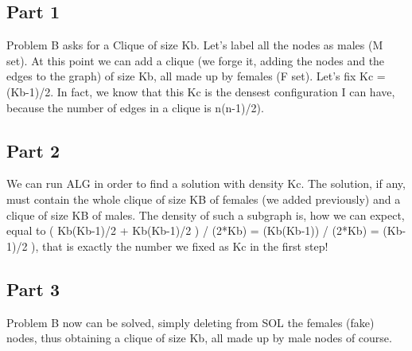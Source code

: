 \subsection{Part 1}
Problem B asks for a Clique of size Kb. Let's label all the nodes as males (M set). At this point we can add a clique (we forge it, adding the nodes and the edges to the graph) of size Kb, all made up by females (F set). Let's fix Kc = (Kb-1)/2. In fact, we know that this Kc is the densest configuration I can have, because the number of edges in a clique is n(n-1)/2). 

\subsection{Part 2}
We can run ALG in order to find a solution with density Kc. The solution, if any, must contain the whole clique of size KB of females (we added previously) and a clique of size KB of males. The density of such a subgraph is, how we can expect, equal to ( Kb(Kb-1)/2 + Kb(Kb-1)/2 ) / (2*Kb) = (Kb(Kb-1)) / (2*Kb) = (Kb-1)/2 ), that is exactly the number we fixed as Kc in the first step!
\subsection{Part 3}
Problem B now can be solved, simply deleting from SOL the females (fake) nodes, thus obtaining a clique of size Kb, all made up by male nodes of course.
